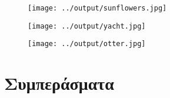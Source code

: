 \documentclass[11pt]{scrartcl} %
\begin{document}
\begin{figure}[H]
  \centerline{\texttt{[image: ../output/sunflowers.jpg]}}
  \caption{}
\end{figure}

\begin{figure}[H]
  \centerline{\texttt{[image: ../output/yacht.jpg]}}
  \caption{}
\end{figure}

\begin{figure}[H]
  \centerline{\texttt{[image: ../output/otter.jpg]}}
  \caption{}
\end{figure}

\section{Συμπεράσματα}
\end{document}
